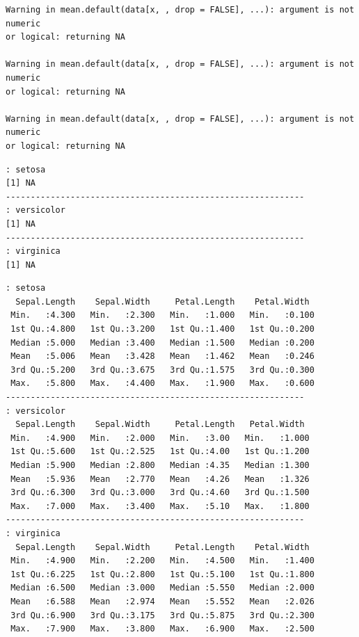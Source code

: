 \documentclass[
  letterpaper,
  DIV=11,
  numbers=noendperiod]{scrreprt}
\newenvironment{Shaded}{\begin{snugshade}}{\end{snugshade}}
\newcommand{\CommentTok}[1]{\textcolor[rgb]{0.37,0.37,0.37}{#1}}
\newcommand{\DecValTok}[1]{\textcolor[rgb]{0.68,0.00,0.00}{#1}}
\newcommand{\FunctionTok}[1]{\textcolor[rgb]{0.28,0.35,0.67}{#1}}
\newcommand{\NormalTok}[1]{\textcolor[rgb]{0.00,0.23,0.31}{#1}}
\newcommand{\SpecialCharTok}[1]{\textcolor[rgb]{0.37,0.37,0.37}{#1}}
\begin{document}
\begin{verbatim}
Warning in mean.default(data[x, , drop = FALSE], ...): argument is not numeric
or logical: returning NA

Warning in mean.default(data[x, , drop = FALSE], ...): argument is not numeric
or logical: returning NA

Warning in mean.default(data[x, , drop = FALSE], ...): argument is not numeric
or logical: returning NA
\end{verbatim}

\begin{verbatim}
: setosa
[1] NA
------------------------------------------------------------ 
: versicolor
[1] NA
------------------------------------------------------------ 
: virginica
[1] NA
\end{verbatim}

\begin{Shaded}
\end{Shaded}

\begin{verbatim}
: setosa
  Sepal.Length    Sepal.Width     Petal.Length    Petal.Width   
 Min.   :4.300   Min.   :2.300   Min.   :1.000   Min.   :0.100  
 1st Qu.:4.800   1st Qu.:3.200   1st Qu.:1.400   1st Qu.:0.200  
 Median :5.000   Median :3.400   Median :1.500   Median :0.200  
 Mean   :5.006   Mean   :3.428   Mean   :1.462   Mean   :0.246  
 3rd Qu.:5.200   3rd Qu.:3.675   3rd Qu.:1.575   3rd Qu.:0.300  
 Max.   :5.800   Max.   :4.400   Max.   :1.900   Max.   :0.600  
------------------------------------------------------------ 
: versicolor
  Sepal.Length    Sepal.Width     Petal.Length   Petal.Width   
 Min.   :4.900   Min.   :2.000   Min.   :3.00   Min.   :1.000  
 1st Qu.:5.600   1st Qu.:2.525   1st Qu.:4.00   1st Qu.:1.200  
 Median :5.900   Median :2.800   Median :4.35   Median :1.300  
 Mean   :5.936   Mean   :2.770   Mean   :4.26   Mean   :1.326  
 3rd Qu.:6.300   3rd Qu.:3.000   3rd Qu.:4.60   3rd Qu.:1.500  
 Max.   :7.000   Max.   :3.400   Max.   :5.10   Max.   :1.800  
------------------------------------------------------------ 
: virginica
  Sepal.Length    Sepal.Width     Petal.Length    Petal.Width   
 Min.   :4.900   Min.   :2.200   Min.   :4.500   Min.   :1.400  
 1st Qu.:6.225   1st Qu.:2.800   1st Qu.:5.100   1st Qu.:1.800  
 Median :6.500   Median :3.000   Median :5.550   Median :2.000  
 Mean   :6.588   Mean   :2.974   Mean   :5.552   Mean   :2.026  
 3rd Qu.:6.900   3rd Qu.:3.175   3rd Qu.:5.875   3rd Qu.:2.300  
 Max.   :7.900   Max.   :3.800   Max.   :6.900   Max.   :2.500  
\end{verbatim}
\end{document}
